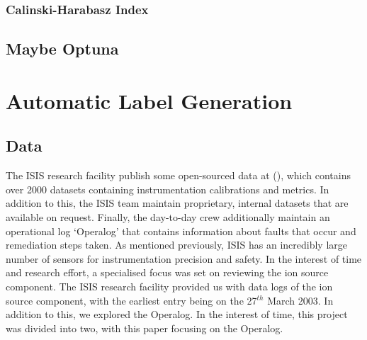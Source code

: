 \documentclass[10pt,oneside]{report}
\begin{document}
\subsection{Calinski-Harabasz Index}

\section{Maybe Optuna}

\chapter{Automatic Label Generation}\label{chap:Methodology}

\section{Data}

The ISIS research facility publish some open-sourced data at (\citet{isisdata}), which contains over 2000 datasets containing instrumentation calibrations and metrics. In addition to this, the ISIS team maintain proprietary, internal datasets that are available on request. Finally, the day-to-day crew additionally maintain an operational log `Operalog' that contains information about faults that occur and remediation steps taken. As mentioned previously, ISIS has an incredibly large number of sensors for instrumentation precision and safety. In the interest of time and research effort, a specialised focus was set on reviewing the ion source component. The ISIS research facility provided us with data logs of the ion source component, with the earliest entry being on the 27$^{th}$ March 2003. In addition to this, we explored the Operalog.  In the interest of time, this project was divided into two, with this paper focusing on the Operalog. 
\end{document}
